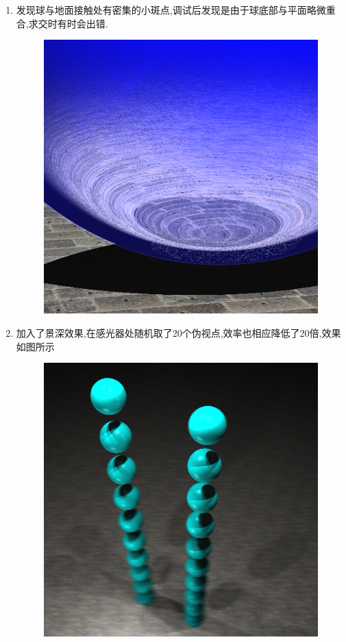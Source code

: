 \begin{enumerate}
\item 发现球与地面接触处有密集的小斑点,调试后发现是由于球底部与平面略微重合,求交时有时会出错.
\begin{figure}[H]
  \centering
  \includegraphics[scale=0.4]{res/smallpoint.png}
\end{figure}

\item 加入了景深效果,在感光器处随机取了20个伪视点,效率也相应降低了20倍,效果如图所示
\begin{figure}[H]
  \centering
  \includegraphics[scale=0.4]{res/dof.png}
  \caption{\label{fig:dof}}
\end{figure}





\end{enumerate}
